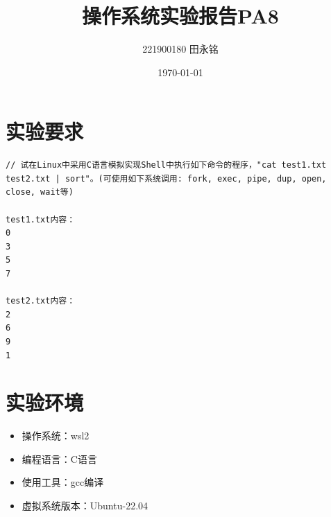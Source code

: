 \documentclass{LabReport}
\title{操作系统实验报告PA8}
\author{221900180 田永铭}
\date{\today}
\begin{document}
	\maketitle
	
	\tableofcontents
	
	\newpage
	
	\section{实验要求}
	\begin{lstlisting}
// 试在Linux中采用C语言模拟实现Shell中执行如下命令的程序，"cat test1.txt test2.txt | sort"。(可使用如下系统调用: fork, exec, pipe, dup, open, close, wait等)

test1.txt内容：
0
3
5
7

test2.txt内容：
2
6
9
1
	\end{lstlisting}

	\section{实验环境}
	
	\begin{itemize}
		\item 操作系统：wsl2
		\item 编程语言：C语言
		\item 使用工具：gcc编译
		\item 虚拟系统版本：Ubuntu-22.04
	\end{itemize}
	
\end{document}
